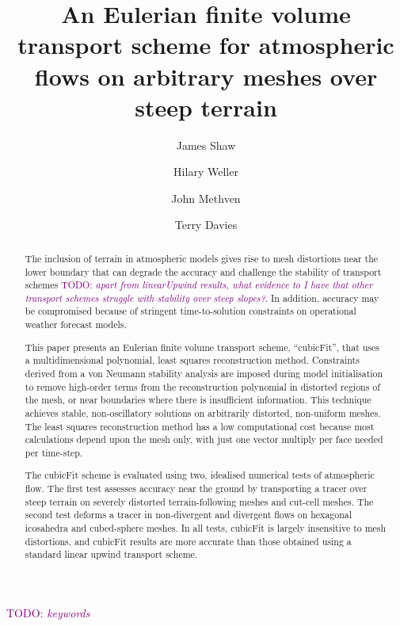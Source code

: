 \documentclass[times]{elsarticle}
\newcommand{\TODO}[1]{\textcolor{purple}{TODO: \emph{#1}}}
\begin{document}
\begin{frontmatter}
\title{An Eulerian finite volume transport scheme for atmospheric flows on arbitrary meshes over steep terrain}
\author[uor]{James Shaw}
\author[uor]{Hilary Weller}
\author[uor]{John Methven}
\author[mo]{Terry Davies}

\address[uor]{Department of Meteorology, University of Reading, Reading, United Kingdom}
\address[mo]{Met Office, Exeter, United Kingdom}

\begin{abstract}
The inclusion of terrain in atmospheric models gives rise to mesh distortions near the lower boundary that can degrade the accuracy and challenge the stability of transport schemes \TODO{apart from linearUpwind results, what evidence to I have that other transport schemes struggle with stability over steep slopes?}.
In addition, accuracy may be compromised because of stringent time-to-solution constraints on operational weather forecast models.

This paper presents an Eulerian finite volume transport scheme, ``cubicFit'', that uses a multidimensional polynomial, least squares reconstruction method.  Constraints derived from a von Neumann stability analysis are imposed during model initialisation to remove high-order terms from the reconstruction polynomial in distorted regions of the mesh, or near boundaries where there is insufficient information.
This technique achieves stable, non-oscillatory solutions on arbitrarily distorted, non-uniform meshes.  The least squares reconstruction method has a low computational cost because most calculations depend upon the mesh only, with just one vector multiply per face needed per time-step.

The cubicFit scheme is evaluated using two, idealised numerical tests of atmospheric flow.  The first test assesses accuracy near the ground by transporting a tracer over steep terrain on severely distorted terrain-following meshes and cut-cell meshes.  The second test deforms a tracer in non-divergent and divergent flows on hexagonal icosahedra and cubed-sphere meshes.
In all tests, cubicFit is largely insensitive to mesh distortions, and cubicFit results are more accurate than those obtained using a standard linear upwind transport scheme.
\end{abstract}

\begin{keyword}
	\TODO{keywords}
\end{keyword}
\end{frontmatter}
\end{document}
